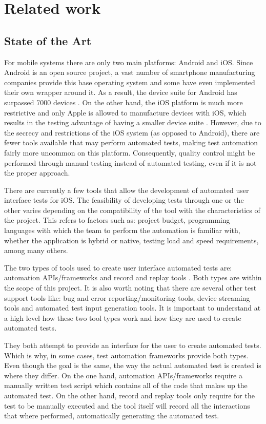 \chapter{Related work}
\label{chapter2}

\section{State of the Art}

For mobile systems there are only two main platforms: Android and iOS. Since Android is an open source project, a vast number of smartphone manufacturing companies provide this base operating system and some have even implemented their own wrapper around it. As a result, the device suite for Android has surpassed 7000 devices \cite{Android Devices}. On the other hand, the iOS platform is much more restrictive and only Apple is allowed to manufacture devices with iOS, which results in the testing advantage of having a smaller device suite \cite{Apple Devices}. However, due to the secrecy and restrictions of the iOS system (as opposed to Android), there are fewer tools available that may perform automated tests, making test automation fairly more uncommon on this platform. Consequently, quality control might be performed through manual testing instead of automated testing, even if it is not the proper approach.

There are currently a few tools that allow the development of automated user interface tests for iOS. The feasibility of developing tests through one or the other varies depending on the compatibility of the tool with the characteristics of the project. This refers to factors such as: project budget, programming languages with which the team to perform the automation is familiar with, whether the application is hybrid or native, testing load and speed requirements, among many others.

The two types of tools used to create user interface automated tests are: automation APIs/frameworks and record and replay tools \cite{Linares-Vasquez2017ContinuousTesting}. Both types are within the scope of this project. It is also worth noting that there are several other test support tools like: bug and error reporting/monitoring tools, device streaming tools and automated test input generation tools. It is important to understand at a high level how these two tool types work and how they are used to create automated tests.

They both attempt to provide an interface for the user to create automated tests. Which is why, in some cases, test automation frameworks provide both types. Even though the goal is the same, the way the actual automated test is created is where they differ. On the one hand, automation APIs/frameworks require a manually written test script which contains all of the code that makes up the automated test. On the other hand, record and replay tools only require for the test to be manually executed and the tool itself will record all the interactions that where performed, automatically generating the automated test.

